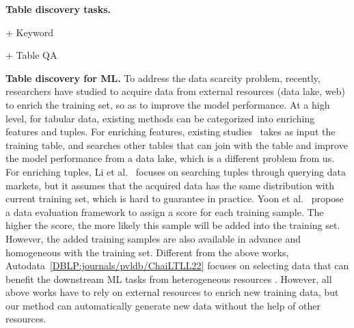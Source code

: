 \noindent \textbf{Table discovery tasks.}

+ Keyword

+ Table QA


\noindent \textbf{Table discovery for ML.}
To address the data scarcity problem, recently, researchers have studied to acquire data from external resources (\eg data lake, web) to enrich the training set, so as to improve the model performance. At a high level, for tabular data, existing methods can be categorized into enriching features and tuples.
For enriching features, existing studies~\cite{DBLP:conf/icde/LiuCLLFT22,
	DBLP:journals/pvldb/ChepurkoMZFKK20,
	DBLP:conf/sigmod/KumarNPZ16} takes as input the training table, and searches other tables that can join with the table and improve the model performance from a data lake, which is a different problem from us.
For enriching tuples, Li et al.~\cite{DBLP:conf/icml/YoonAP20} focuses on searching tuples through querying data markets, but it assumes that the acquired data has the same distribution with current training set, which is hard to guarantee in practice. Yoon et al.~\cite{DBLP:journals/pvldb/LiYK21} propose a data evaluation framework to assign a score for each training sample. The higher the score, the more likely this sample will be added into the training set.  However, the added training samples are also available in advance and homogeneous with the training set. Different from the above works, Autodata~\ref{DBLP:journals/pvldb/ChaiLTLL22} focuses on selecting data that can benefit the downstream ML tasks from heterogeneous resources . However, all  above works have to rely on external resources to enrich new training data, but our method can automatically generate new data without the help of other resources.